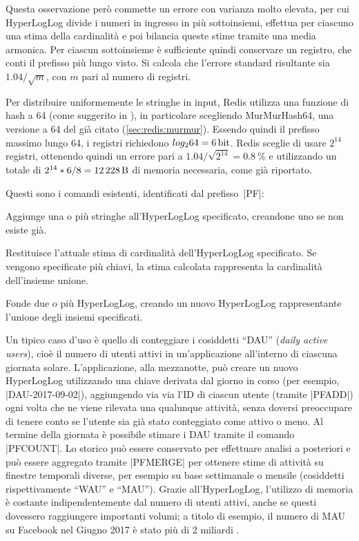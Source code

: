 Questa osservazione però commette un errore con varianza molto elevata, per cui HyperLogLog divide i
numeri in ingresso in più sottoinsiemi, effettua per ciascuno una stima della cardinalità e poi
bilancia queste stime tramite una media armonica. Per ciascun sottoinsieme è sufficiente quindi
conservare un registro, che conti il prefisso più lungo visto. Si calcola che l'errore standard 
risultante sia $1.04 / \sqrt{m}$, con $m$ pari al numero di registri. 

Per distribuire uniformemente le stringhe in input, Redis utilizza una funzione di hash a
\SI{64}{\bit} (come suggerito in \cite{hyperloglog-plusplus}), in particolare scegliendo
MurMurHash64, una versione a \SI{64}{\bit} del già citato
(\autoref{sec:redis:murmur}). Essendo quindi il prefisso massimo lungo \SI{64}{\bit}, i
registri richiedono $log_2{64} = \SI{6}{\bit}$. Redis sceglie di usare $2^{14}$ registri, ottenendo
quindi un errore pari a $1.04 / \sqrt{2^{14}} = \SI{0.8}{\percent}$ e utilizzando un totale di
$2^{14} * 6 / 8 = \SI{12228}{\byte}$ di memoria necessaria, come già riportato.

Questi sono i comandi esistenti, identificati dal prefisso~\cverb|PF|:

\begin{description}[style=nextline,font={\bfseries\ttfamily}]
	\item[{PFADD key ele [ele\dots]}] Aggiunge una o più stringhe all'HyperLogLog specificato,
	cre\-an\-do\-ne uno se non esiste già.
	\item[{PFCOUNT key [key\dots]}] Restituisce l'attuale stima di cardinalità dell'HyperLogLog
	specificato. Se vengono specificate più chiavi, la stima calcolata rappresenta la cardinalità
	dell'insieme unione.
	\item[{PFMERGE dest key [key\dots]}] Fonde due o più HyperLogLog, creando un nuovo Hyper\-Log\-Log
	rappresentante l'unione degli insiemi specificati.
\end{description}

Un tipico caso d'uso è quello di conteggiare i cosiddetti ``DAU'' (\emph{daily active users}), cioè
il numero di utenti attivi in un'applicazione all'interno di ciascuna giornata solare.
L'applicazione, alla mezzanotte, può creare un nuovo HyperLogLog utilizzando una chiave derivata dal
giorno in corso (per esempio, \cverb|DAU-2017-09-02|), aggiungendo via via l'ID di ciascun utente
(tramite \cverb|PFADD|) ogni volta che ne viene rilevata una qualunque attività, senza doversi
preoccupare di tenere conto se l'utente sia già stato conteggiato come attivo o meno. Al termine
della giornata è possibile stimare i DAU tramite il comando \cverb|PFCOUNT|. Lo storico può
essere conservato per effettuare analisi a posteriori e può essere aggregato tramite
\cverb|PFMERGE| per ottenere stime di attività su finestre temporali diverse, per esempio su base
settimanale o mensile (cosiddetti rispettivamente ``WAU'' e ``MAU''). Grazie all'HyperLogLog,
l'utilizzo di memoria è costante indipendentemente dal numero di utenti attivi, anche se questi
dovessero raggiungere importanti volumi; a titolo di esempio, il numero di MAU su Facebook nel
Giugno 2017 è stato più di 2 miliardi \cite{fb-mau}.

